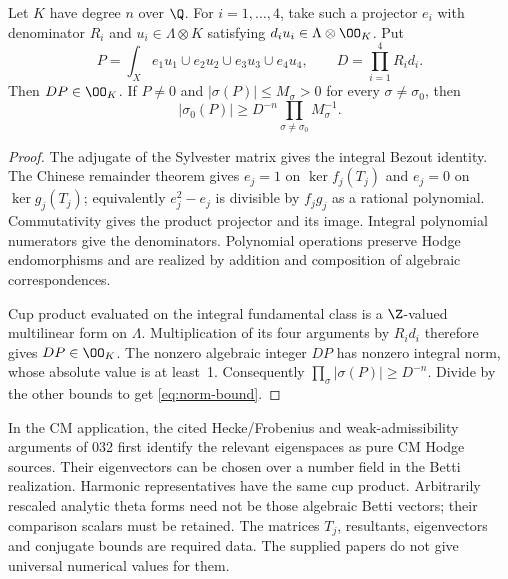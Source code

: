 Let $K$ have degree $n$ over $\Q$. For $i=1,\ldots,4$, take such a projector $e_i$ with denominator $R_i$ and $u_i\in\Lambda\otimes K$ satisfying
$d_i u_i\in\Lambda\otimes\OO_K$. Put
\[
 P=\int_X e_1u_1\cup e_2u_2\cup e_3u_3\cup e_4u_4,
 \qquad D=\prod_{i=1}^4R_i d_i.
\]
Then $DP\in\OO_K$. If $P\ne0$ and
$|\sigma(P)|\leq M_\sigma>0$ for every $\sigma\ne\sigma_0$, then
\begin{equation}\label{eq:norm-bound}
 |\sigma_0(P)|\geq D^{-n}\prod_{\sigma\ne\sigma_0}M_\sigma^{-1}.
\end{equation}
\begin{proof}
The adjugate of the Sylvester matrix gives the integral Bezout identity. The Chinese remainder theorem gives $e_j=1$ on $\ker f_j(T_j)$ and $e_j=0$ on $\ker g_j(T_j)$; equivalently $e_j^2-e_j$ is divisible by $f_jg_j$ as a rational polynomial. Commutativity gives the product projector and its image. Integral polynomial numerators give the denominators. Polynomial operations preserve Hodge endomorphisms and are realized by addition and composition of algebraic correspondences.

Cup product evaluated on the integral fundamental class is a $\Z$-valued multilinear form on $\Lambda$. Multiplication of its four arguments by $R_i d_i$ therefore gives $DP\in\OO_K$. The nonzero algebraic integer $DP$ has nonzero integral norm, whose absolute value is at least~1. Consequently
$\prod_\sigma|\sigma(P)|\geq D^{-n}$. Divide by the other bounds to get \eqref{eq:norm-bound}.
\end{proof}
In the CM application, the cited Hecke/Frobenius and weak-admissibility arguments of 032 first identify the relevant eigenspaces as pure CM Hodge sources. Their eigenvectors can be chosen over a number field in the Betti realization. Harmonic representatives have the same cup product. Arbitrarily rescaled analytic theta forms need not be those algebraic Betti vectors; their comparison scalars must be retained. The matrices $T_j$, resultants, eigenvectors and conjugate bounds are required data. The supplied papers do not give universal numerical values for them.
